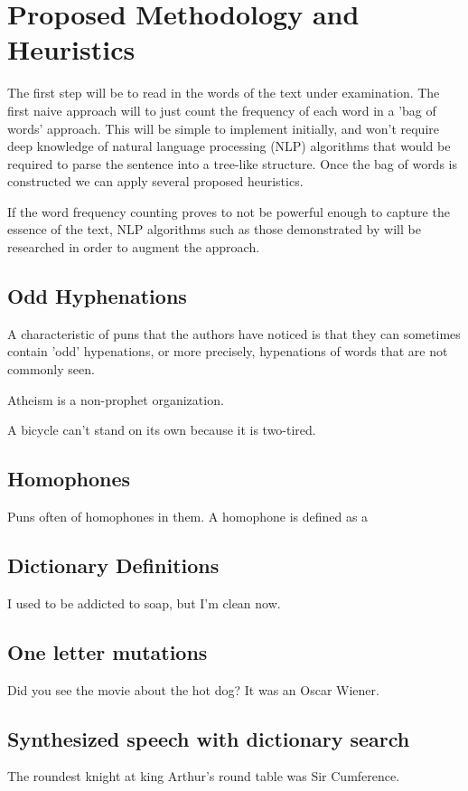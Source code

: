 
\section{Proposed Methodology and Heuristics}
The first step will be to read in the words of the text under examination. The first naive approach will to just count the frequency of each word in a 'bag of words' approach. This will be simple to implement initially, and won't require deep knowledge of natural language processing (NLP) algorithms that would be required to parse the sentence into a tree-like structure. Once the bag of words is constructed we can apply several proposed heuristics.

If the word frequency counting proves to not be powerful enough to capture the essence of the text, NLP algorithms such as those demonstrated by \cite{stanfordparser} will be researched in order to augment the approach. 

\subsection{Odd Hyphenations}
A characteristic of puns that the authors have noticed is that they can sometimes contain 'odd' hypenations, or more precisely, hypenations of words that are not commonly seen.

Atheism is a non-prophet organization.	

A bicycle can't stand on its own because it is two-tired.

\subsection{Homophones}
Puns often of homophones in them. A homophone is defined as a 

\subsection{Dictionary Definitions}

I used to be addicted to soap, but I'm clean now.

\subsection{One letter mutations}

Did you see the movie about the hot dog? It was an Oscar Wiener.

\subsection{Synthesized speech with dictionary search}
The roundest knight at king Arthur's round table was Sir Cumference.
